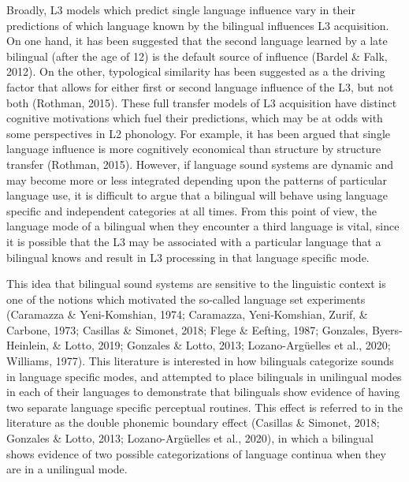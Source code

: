 \documentclass[
  man]{apa6}
\begin{document}
Broadly, L3 models which predict single language influence vary in their predictions of which language known by the bilingual influences L3 acquisition. On one hand, it has been suggested that the second language learned by a late bilingual (after the age of 12) is the default source of influence (Bardel \& Falk, 2012).
On the other, typological similarity has been suggested as a the driving factor that allows for either first or second language influence of the L3, but not both (Rothman, 2015).
These full transfer models of L3 acquisition have distinct cognitive motivations which fuel their predictions, which may be at odds with some perspectives in L2 phonology.
For example, it has been argued that single language influence is more cognitively economical than structure by structure transfer (Rothman, 2015).
However, if language sound systems are dynamic and may become more or less integrated depending upon the patterns of particular language use, it is difficult to argue that a bilingual will behave using language specific and independent categories at all times.
From this point of view, the language mode of a bilingual when they encounter a third language is vital, since it is possible that the L3 may be associated with a particular language that a bilingual knows and result in L3 processing in that language specific mode.

This idea that bilingual sound systems are sensitive to the linguistic context is one of the notions which motivated the so-called language set experiments
(Caramazza \& Yeni-Komshian, 1974; Caramazza, Yeni‐Komshian, Zurif, \& Carbone, 1973; Casillas \& Simonet, 2018; Flege \& Eefting, 1987; Gonzales, Byers-Heinlein, \& Lotto, 2019; Gonzales \& Lotto, 2013; Lozano-Argüelles et al., 2020; Williams, 1977).
This literature is interested in how bilinguals categorize sounds in language specific modes, and attempted to place bilinguals in unilingual modes in each of their languages to demonstrate that bilinguals show evidence of having two separate language specific perceptual routines.
This effect is referred to in the literature as the double phonemic boundary effect (Casillas \& Simonet, 2018; Gonzales \& Lotto, 2013; Lozano-Argüelles et al., 2020), in which a bilingual shows evidence of two possible categorizations of language continua when they are in a unilingual mode.
\end{document}
